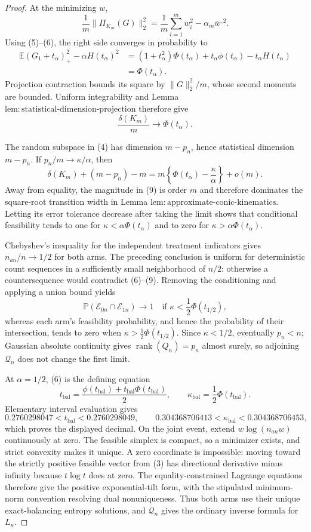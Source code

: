 \documentclass{article}
\begin{document}
\begin{proof}
At the minimizing \(w\),
\[
 \frac1m\|\Pi_{K_m}(G)\|_2^2
 =\frac1m\sum_{i=1}^mw_i^2-\alpha_m\bar w^{,2}.
\]
Using (5)--(6), the right side converges in probability to
\[
 \begin{aligned}
 \mathbb E(G_1+t_\alpha)_+^2-\alpha H(t_\alpha)^2
 &=(1+t_\alpha^2)\Phi(t_\alpha)+t_\alpha\phi(t_\alpha)
   -t_\alpha H(t_\alpha)\\
 &=\Phi(t_\alpha).
 \end{aligned}
 \tag{7}
\]
Projection contraction bounds its square by \(\|G\|_2^2/m\), whose second moments are bounded.  Uniform integrability and Lemma \(\mathrm{lem{:}statistical\mbox{-}dimension\mbox{-}projection}\) therefore give
\[
 \frac{\delta(K_m)}m\longrightarrow\Phi(t_\alpha).
 \tag{8}
\]

The random subspace in (4) has dimension \(m-p_n\), hence statistical dimension \(m-p_n\).  If \(p_n/m\to\kappa/\alpha\), then
\[
 \delta(K_m)+(m-p_n)-m
 =m\left\{\Phi(t_\alpha)-\frac\kappa\alpha\right\}+o(m).
 \tag{9}
\]
Away from equality, the magnitude in (9) is order \(m\) and therefore dominates the square-root transition width in Lemma \(\mathrm{lem{:}approximate\mbox{-}conic\mbox{-}kinematics}\).  Letting its error tolerance decrease after taking the limit shows that conditional feasibility tends to one for \(\kappa<\alpha\Phi(t_\alpha)\) and to zero for \(\kappa>\alpha\Phi(t_\alpha)\).

Chebyshev's inequality for the independent treatment indicators gives \(n_{an}/n\to1/2\) for both arms.  The preceding conclusion is uniform for deterministic count sequences in a sufficiently small neighborhood of \(n/2\): otherwise a countersequence would contradict (6)--(9).  Removing the conditioning and applying a union bound yields
\[
 \mathbb P(\mathcal E_{0n}\cap\mathcal E_{1n})\to1
 \quad\text{if }\kappa<\frac12\Phi(t_{1/2}),
\]
whereas each arm's feasibility probability, and hence the probability of their intersection, tends to zero when \(\kappa>\frac12\Phi(t_{1/2})\).  Since \(\kappa<1/2\), eventually \(p_n<n\); Gaussian absolute continuity gives \(\operatorname{rank}(Q_n)=p_n\) almost surely, so adjoining \(\mathcal Q_n\) does not change the first limit.

At \(\alpha=1/2\), (6) is the defining equation
\[
 t_{\mathrm{bal}}
 =\frac{\phi(t_{\mathrm{bal}})+t_{\mathrm{bal}}\Phi(t_{\mathrm{bal}})}2,
 \qquad
 \kappa_{\mathrm{bal}}=\frac12\Phi(t_{\mathrm{bal}}).
\]
Elementary interval evaluation gives
\[
 0.2760298047<t_{\mathrm{bal}}<0.2760298049,
 \qquad
 0.304368706413<\kappa_{\mathrm{bal}}<0.304368706453,
\]
which proves the displayed decimal.  On the joint event, extend \(w\log(n_{an}w)\) continuously at zero.  The feasible simplex is compact, so a minimizer exists, and strict convexity makes it unique.  A zero coordinate is impossible: moving toward the strictly positive feasible vector from (3) has directional derivative minus infinity because \(t\log t\) does at zero.  The equality-constrained Lagrange equations therefore give the positive exponential-tilt form, with the stipulated minimum-norm convention resolving dual nonuniqueness.  Thus both arms use their unique exact-balancing entropy solutions, and \(\mathcal Q_n\) gives the ordinary inverse formula for \(L_n\).


\end{proof}
\end{document}
